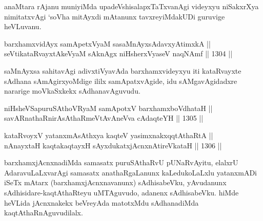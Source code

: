 \begin{artha}
anaMtara rAjanu muniyiMda upadeVshisalapxTaTxvanAgi videyxyu niSakxrXya nimitatxvAgi `soV\s ha mitAyxdi mAtanunx tavxreyiMdakUDi guruvige heVLuvanu.
\end{artha}


\begin{shl}
barxhamxvidAyx samApetxVyaM sasaMnAyxsA\s davxyAtimxkA || \\
seVtikataRvayxtAkeVyaM sAknAgx niHsherxVyaseV naqNAmf \hfill || 1304 ||  
\end{shl}

\begin{artha}
saMnAyxsa sahitavAgi adivxtiVyavAda barxhamxvideyxyu iti kataRvayxte sAdhana sAmAgirxyoMdige ililx samApatxvAgide, idu sAMgavAgidadxre nararige moVkaSxkekx sAdhanavAguvudu.
\end{artha}




\begin{shl}	
niHsheVSapuruSAthoVR\s yaM samApotxV barxhamxboVdhataH || \\
savARnathaRnirAsAthaRmeVtAvAneVva cA\s \s daqteYH \hfill || 1305 ||  
\end{shl}
				
\begin{shl}
kataRvoyxV yatanxmAsAthxya kaqteV yasimxnakxqqtAthaRtA || \\
nAnayxtaH kaqtakaqtayxH sAyxdukatxjAcnxnAtireVkataH \hfill || 1306 ||  
\end{shl}

\begin{artha}
barxhamxjAcnxnadiMda samasatx puruSAthaRvU pUNaRvAyitu, elalxrU AdaravuLaLxvarAgi samasatx anathaRgaLanunx kaLedukoLaLxlu yatanxmADi iSeTx mAtarx (barxhamxjAcnxnavanunx) sAdhisabeVku, yAvudanunx sAdhisidare-kaqtAthaRteyu uMTAguvudo, adanenx sAdhisabeVku. hiMde heVLida jAcnxnakekx beVreyAda matotxMdu sAdhanadiMda kaqtAthaRnAguvudilalx.
\end{artha}



